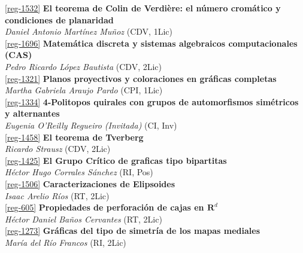 \begin{multicols}{2}
\noindent  \ref{reg-1532}  {\bfseries El teorema de Colin de Verdi\`ere: el n\'umero crom\'atico y condiciones de planaridad}\\
{\slshape  Daniel Antonio Mart\'inez Mu\~noz} {\footnotesize (CDV, 1Lic)}\\

\noindent  \ref{reg-1696}  {\bfseries Matem\'atica discreta y sistemas algebraicos computacionales (CAS)}\\
{\slshape  Pedro Ricardo L\'opez Bautista} {\footnotesize (CDV, 2Lic)}\\

\noindent  \ref{reg-1321}  {\bfseries Planos proyectivos y coloraciones en gr\'aficas completas}\\
{\slshape  Martha Gabriela Araujo Pardo} {\footnotesize (CPI, 1Lic)}\\

\noindent  \ref{reg-1334}  {\bfseries 4-Politopos quirales con grupos de automorfismos sim\'etricos y alternantes}\\
{\slshape  Eugenia  O'Reilly Regueiro (Invitada)} {\footnotesize (CI, Inv)}\\

\noindent  \ref{reg-1458}  {\bfseries El teorema de Tverberg}\\
{\slshape  Ricardo  Strausz} {\footnotesize (CDV, 2Lic)}\\

\noindent  \ref{reg-1425}  {\bfseries El Grupo Cr\'itico de graficas tipo bipartitas}\\
{\slshape  H\'ector Hugo Corrales S\'anchez} {\footnotesize (RI, Pos)}\\

\noindent  \ref{reg-1506}  {\bfseries Caracterizaciones de Elipsoides}\\
{\slshape  Isaac Arelio R\'ios} {\footnotesize (RT, 2Lic)}\\

\noindent  \ref{reg-605}  {\bfseries Propiedades de perforaci\'on de cajas en $\mathbf{R}^d$}\\
{\slshape  H\'ector Daniel Ba\~nos Cervantes} {\footnotesize (RT, 2Lic)}\\

\noindent  \ref{reg-1273}  {\bfseries Gr\'aficas del tipo de simetr\'ia de los mapas mediales}\\
{\slshape  Mar\'ia  del R\'io Francos} {\footnotesize (RI, 2Lic)}\\


\end{multicols}
